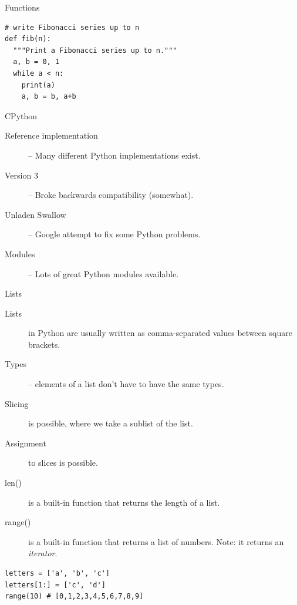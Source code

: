 \begin{frame}[fragile]{Functions}
  \begin{verbatim}
# write Fibonacci series up to n
def fib(n):   
  """Print a Fibonacci series up to n."""
  a, b = 0, 1
  while a < n:
    print(a)
    a, b = b, a+b
  \end{verbatim}
\end{frame}

\begin{frame}{CPython}
  \begin{description}
    \item[Reference implementation] -- Many different Python implementations exist.
    \vspace{0.25cm}
    \item[Version 3] -- Broke backwards compatibility (somewhat).
    \vspace{0.25cm}
    \item[Unladen Swallow] -- Google attempt to fix some Python problems.
    \vspace{0.25cm}
    \item[Modules] -- Lots of great Python modules available.
  \end{description}
\end{frame}

\begin{frame}[fragile]{Lists}
  \begin{description}
    \item[Lists] in Python are usually written as comma-separated values between square brackets.
    \item[Types] -- elements of a list don't have to have the same types.
    \item[Slicing] is possible, where we take a sublist of the list.
    \item[Assignment] to slices is possible.
    \item[len()] is a built-in function that returns the length of a list.
    \item[range()] is a built-in function that returns a list of numbers. Note: it returns an \emph{iterator}.
  \end{description}
  \begin{verbatim}
letters = ['a', 'b', 'c']
letters[1:] = ['c', 'd']
range(10) # [0,1,2,3,4,5,6,7,8,9]
  \end{verbatim}
\end{frame}

